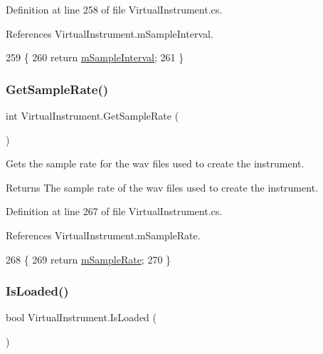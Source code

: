Definition at line 258 of file Virtual\+Instrument.\+cs.



References Virtual\+Instrument.\+m\+Sample\+Interval.


\begin{DoxyCode}
259     \{
260         \textcolor{keywordflow}{return} \hyperlink{group___v_i_base_pro_var_ga20c1d3d25ea666378d72c833d160ae2e}{mSampleInterval};
261     \}
\end{DoxyCode}
\mbox{\label{group___v_i_base_pub_func_ga8be9d452abaf025dc7270c36b3cf379a}} 
\subsubsection{\texorpdfstring{Get\+Sample\+Rate()}{GetSampleRate()}}
{\footnotesize\ttfamily int Virtual\+Instrument.\+Get\+Sample\+Rate (\begin{DoxyParamCaption}{ }\end{DoxyParamCaption})}



Gets the sample rate for the wav files used to create the instrument. 

\begin{DoxyReturn}{Returns}
The sample rate of the wav files used to create the instrument. 
\end{DoxyReturn}


Definition at line 267 of file Virtual\+Instrument.\+cs.



References Virtual\+Instrument.\+m\+Sample\+Rate.


\begin{DoxyCode}
268     \{
269         \textcolor{keywordflow}{return} \hyperlink{group___v_i_base_pro_var_ga80b3d2ff29b27698eea6bcf2f8ddc5d7}{mSampleRate};
270     \}
\end{DoxyCode}
\mbox{\label{group___v_i_base_pub_func_gae8b5ac2e3402dfc50ea43f0e91fd9a29}} 
\subsubsection{\texorpdfstring{Is\+Loaded()}{IsLoaded()}}
{\footnotesize\ttfamily bool Virtual\+Instrument.\+Is\+Loaded (\begin{DoxyParamCaption}{ }\end{DoxyParamCaption})}



